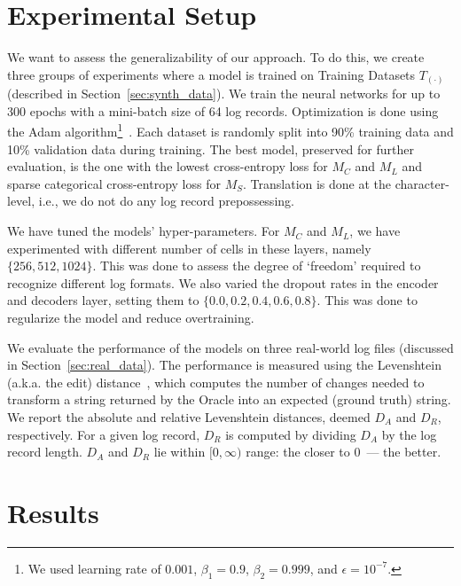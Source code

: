 \documentclass{article}
\begin{document}
\section{Experimental Setup} \label{sec:setup}
We want to assess the generalizability of our approach. To do this, we create three groups of experiments where a model is trained on Training Datasets $T_{(\cdot)}$ (described in Section~\ref{sec:synth_data}). We train the neural networks for up to 300 epochs with a mini-batch size of 64 log records. Optimization is done using the Adam algorithm\footnote{We used learning rate of $0.001$, $\beta_1=0.9$, $\beta_2=0.999$, and $\epsilon=10^{-7}$.}~\cite{DBLP:journals/corr/KingmaB14}. Each dataset is randomly split into 90\% training data and 10\% validation data during training.  The best model, preserved for further evaluation, is the one with the lowest cross-entropy loss for $M_C$ and $M_L$ and sparse categorical cross-entropy loss for $M_S$. Translation is done at the character-level, i.e., we do not do any log record prepossessing.

We have tuned the models' hyper-parameters. For $M_C$ and $M_L$, we have experimented with different number of cells in these layers, namely $\{256, 512, 1024\}$. This was done to assess the degree of `freedom' required to recognize different log formats. We also varied the dropout rates in the encoder and decoders layer, setting them to $\{0.0, 0.2, 0.4, 0.6, 0.8\}$. This was done to regularize the model and reduce overtraining.

We evaluate the performance of the models on three real-world log files (discussed in Section~\ref{sec:real_data}). The performance is measured using the Levenshtein (a.k.a. the edit) distance~\cite{levenshtein1966binary}, which computes the number of changes needed to transform a string returned by the Oracle into an expected (ground truth) string. 
We report the absolute and relative Levenshtein distances, deemed $D_A$ and $D_R$, respectively. For a given log record, $D_R$ is computed by dividing $D_A$ by the log record length. $D_A$ and $D_R$ lie within $[0, \infty)$ range: the closer to $0$~--- the better. 

\section{Results} \label{sec:results}
\end{document}
